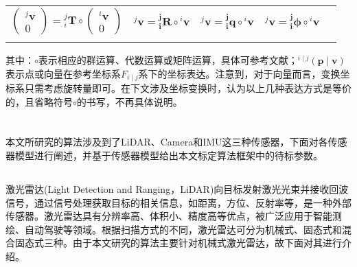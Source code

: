 \begin{table*}[htbp]
\begin{tabular}{c|c|c|c|c}
    $\begin{pmatrix}
         {^{j}}\boldsymbol{v} \\0
       \end{pmatrix}={^{j}_{i}}\boldsymbol{T} \circ\begin{pmatrix}
                                                     {^{i}}\boldsymbol{v} \\0
                                                   \end{pmatrix}$
                             &
    ${^{j}}\boldsymbol{v}={^{\boldsymbol{j}}_{\boldsymbol{i}}}\boldsymbol{R}\circ{^{i}}\boldsymbol{v}$
                             &
    ${^{j}}\boldsymbol{v}={^{\boldsymbol{j}}_{\boldsymbol{i}}}\boldsymbol{q}\circ{^{i}}\boldsymbol{v}$
                             &
    ${^{j}}\boldsymbol{v}={^{\boldsymbol{j}}_{\boldsymbol{i}}}\boldsymbol{\phi}\circ{^{i}}\boldsymbol{v}$                                                                                                                                                                                        \\
                             &                                                             &                                                                &                                                                &                                                                   \\
    \hline
  \end{tabular}
  \caption{}
  \label{tab:rbt}
\end{table*}
\newline
其中：$\circ$表示相应的群运算、代数运算或矩阵运算，具体可参考文献\cite{sola2018micro}；${^{i\mid j}}(\boldsymbol{p}\mid\boldsymbol{v})$表示点或向量在参考坐标系$F_{i\mid j}$系下的坐标表达。注意到，对于向量而言，变换坐标系只需考虑旋转量即可。在下文涉及坐标变换时，认为以上几种表达方式是等价的，且省略符号$\circ$的书写，不再具体说明。

\section{}
本文所研究的算法涉及到了LiDAR、Camera和IMU这三种传感器，下面对各传感器模型进行阐述，并基于传感器模型给出本文标定算法框架中的待标参数。
\subsection{}
激光雷达(Light Detection and Ranging，LiDAR)向目标发射激光光束并接收回波信号，通过信号处理获取目标的相关信息，如距离，方位、反射率等，是一种外部传感器。激光雷达具有分辨率高、体积小、精度高等优点，被广泛应用于智能测绘、自动驾驶等领域。根据扫描方式的不同，激光雷达可分为机械式、固态式和混合固态式三种。由于本文研究的算法主要针对机械式激光雷达，故下面对其进行介绍。

